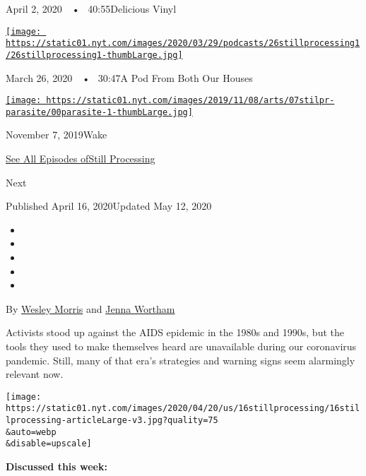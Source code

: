 April 2, 2020~~•~ 40:55Delicious Vinyl

\href{https://www.nytimes.com/2020/03/26/podcasts/still-processing-quarantine.html?action=click\&module=audio-series-bar\&region=header\&pgtype=Article}{\texttt{[image: https://static01.nyt.com/images/2020/03/29/podcasts/26stillprocessing1/26stillprocessing1-thumbLarge.jpg]}}

March 26, 2020~~•~ 30:47A Pod From Both Our Houses

\href{https://www.nytimes.com/2019/11/07/podcasts/still-processing-parasite-watchmen-bong-joon-ho.html?action=click\&module=audio-series-bar\&region=header\&pgtype=Article}{\texttt{[image: https://static01.nyt.com/images/2019/11/08/arts/07stilpr-parasite/00parasite-1-thumbLarge.jpg]}}

November 7, 2019Wake

\href{https://www.nytimes.com/column/still-processing-podcast}{See All
Episodes ofStill Processing}

Next

Published April 16, 2020Updated May 12, 2020

\begin{itemize}
\item
\item
\item
\item
\item
\end{itemize}

By \href{https://www.nytimes.com/by/wesley-morris}{Wesley Morris} and
\href{https://www.nytimes.com/by/jenna-wortham}{Jenna Wortham}

Activists stood up against the AIDS epidemic in the 1980s and 1990s, but
the tools they used to make themselves heard are unavailable during our
coronavirus pandemic. Still, many of that era's strategies and warning
signs seem alarmingly relevant now.

\texttt{[image: https://static01.nyt.com/images/2020/04/20/us/16stillprocessing/16stillprocessing-articleLarge-v3.jpg?quality=75\\\&auto=webp\\\&disable=upscale]}

\textbf{Discussed this week:}


